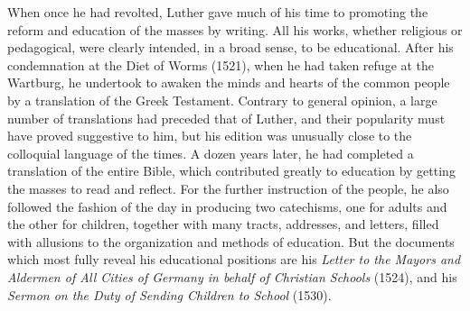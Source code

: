 \documentclass[
]{book}
\begin{document}
When once he had revolted, Luther gave much of his time to promoting the reform and education of the masses by writing. All his works, whether religious or pedagogical, were clearly intended, in a broad sense, to be educational. After his condemnation at the Diet of Worms (1521), when he had taken refuge at the Wartburg, he undertook to awaken the minds and hearts of the common people by a translation of the Greek Testament. Contrary to general opinion, a large number of translations had preceded that of Luther, and their popularity must have proved suggestive to him, but his edition was unusually close to the colloquial language of the times. A dozen years later, he had completed a translation of the entire Bible, which contributed greatly to education by getting the masses to read and reflect. For the further instruction of the people, he also followed the fashion of the day in producing two catechisms, one for adults and the other for children, together with many tracts, addresses, and letters, filled with allusions to the organization and methods of education. But the documents which most fully reveal his educational positions are his \emph{Letter to the Mayors and Aldermen of All Cities of Germany in behalf of Christian Schools} (1524), and his \emph{Sermon on the Duty of Sending Children to School} (1530).
\end{document}
